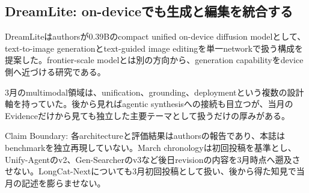\subsection{DreamLite: on-deviceでも生成と編集を統合する}

DreamLiteはauthorsが0.39Bのcompact unified on-device diffusion modelとして、text-to-image generationとtext-guided image editingを単一networkで扱う構成を提案した。frontier-scale modelとは別の方向から、generation capabilityをdevice側へ近づける研究である。\autocite{src-b8369fd2c988}


3月のmultimodal領域は、unification、grounding、deploymentという複数の設計軸を持っていた。後から見ればagentic synthesisへの接続も目立つが、当月のEvidenceだけから見ても独立した主要テーマとして扱うだけの厚みがある。\autocite{src-197775677c0d,src-abece2adf5a7,src-ac36472a8f09,src-b8369fd2c988}


\begin{claimboundary}
Claim Boundary: 各architectureと評価結果はauthorsの報告であり、本誌はbenchmarkを独立再現していない。March chronologyは初回投稿を基準とし、Unify-Agentのv2、Gen-Searcherのv3など後日revisionの内容を3月時点へ遡及させない。LongCat-Nextについても3月初回投稿として扱い、後から得た知見で当月の記述を膨らませない。\autocite{src-197775677c0d,src-abece2adf5a7,src-ac36472a8f09,src-b8369fd2c988}
\end{claimboundary}
